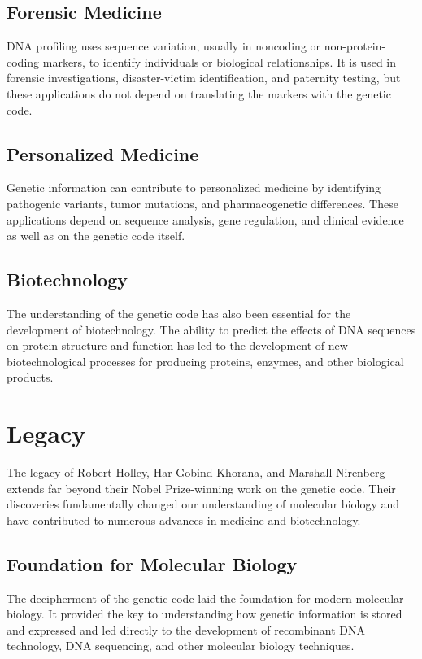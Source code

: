 \subsection{Forensic Medicine}

DNA profiling uses sequence variation, usually in noncoding or non-protein-coding markers, to identify individuals or biological relationships. It is used in forensic investigations, disaster-victim identification, and paternity testing, but these applications do not depend on translating the markers with the genetic code.

\subsection{Personalized Medicine}

Genetic information can contribute to personalized medicine by identifying pathogenic variants, tumor mutations, and pharmacogenetic differences. These applications depend on sequence analysis, gene regulation, and clinical evidence as well as on the genetic code itself.

\subsection{Biotechnology}

The understanding of the genetic code has also been essential for the development of biotechnology. The ability to predict the effects of DNA sequences on protein structure and function has led to the development of new biotechnological processes for producing proteins, enzymes, and other biological products.

\section{Legacy}

The legacy of Robert Holley, Har Gobind Khorana, and Marshall Nirenberg extends far beyond their Nobel Prize-winning work on the genetic code. Their discoveries fundamentally changed our understanding of molecular biology and have contributed to numerous advances in medicine and biotechnology.

\subsection{Foundation for Molecular Biology}

The decipherment of the genetic code laid the foundation for modern molecular biology. It provided the key to understanding how genetic information is stored and expressed and led directly to the development of recombinant DNA technology, DNA sequencing, and other molecular biology techniques.

